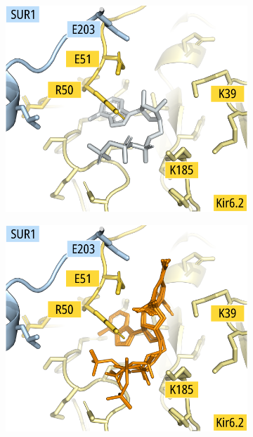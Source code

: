 \begin{figure}[hbtp]
\begin{subfigure}[t]{0.30\textwidth}
	\end{subfigure}
	\vfill
	\begin{subfigure}[t]{0.4\textwidth}
		\caption{}\label{ch3fig:6c3p_bound}
		\centering
		\includegraphics[width=\textwidth]{6c3p_site_bound_2.pdf}
	\end{subfigure}
	\hfill
	\begin{subfigure}[t]{0.4\textwidth}
		\caption{}\label{ch3fig:6c3p_docked}
		\centering
		\includegraphics[width=\textwidth]{6c3p_site_docked_2.pdf}
	\end{subfigure}
	

\end{figure}
